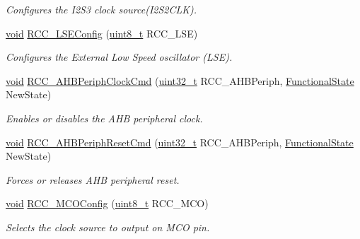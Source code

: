 \begin{DoxyCompactItemize}
\begin{DoxyCompactList}\small\item\em Configures the I2\-S3 clock source(\-I2\-S2\-C\-L\-K). \end{DoxyCompactList}\item 
\hyperlink{group___n_a_m_e_ga18028b8badbf1ea7e704ccac3c488e82}{void} \hyperlink{group___r_c_c___exported___functions_ga65209ab5c3589b249c7d70f978735ca6}{R\-C\-C\-\_\-\-L\-S\-E\-Config} (\hyperlink{stdint_8h_aba7bc1797add20fe3efdf37ced1182c5}{uint8\-\_\-t} R\-C\-C\-\_\-\-L\-S\-E)
\begin{DoxyCompactList}\small\item\em Configures the External Low Speed oscillator (L\-S\-E). \end{DoxyCompactList}\item 
\hyperlink{group___n_a_m_e_ga18028b8badbf1ea7e704ccac3c488e82}{void} \hyperlink{group___r_c_c___exported___functions_gae0b30d8598b8393bdba9c3fefba3a968}{R\-C\-C\-\_\-\-A\-H\-B\-Periph\-Clock\-Cmd} (\hyperlink{stdint_8h_a435d1572bf3f880d55459d9805097f62}{uint32\-\_\-t} R\-C\-C\-\_\-\-A\-H\-B\-Periph, \hyperlink{group___exported__types_gac9a7e9a35d2513ec15c3b537aaa4fba1}{Functional\-State} New\-State)
\begin{DoxyCompactList}\small\item\em Enables or disables the A\-H\-B peripheral clock. \end{DoxyCompactList}\item 
\hyperlink{group___n_a_m_e_ga18028b8badbf1ea7e704ccac3c488e82}{void} \hyperlink{group___r_c_c___exported___functions_ga0d6761fbffe7e916c7aa043cabde180a}{R\-C\-C\-\_\-\-A\-H\-B\-Periph\-Reset\-Cmd} (\hyperlink{stdint_8h_a435d1572bf3f880d55459d9805097f62}{uint32\-\_\-t} R\-C\-C\-\_\-\-A\-H\-B\-Periph, \hyperlink{group___exported__types_gac9a7e9a35d2513ec15c3b537aaa4fba1}{Functional\-State} New\-State)
\begin{DoxyCompactList}\small\item\em Forces or releases A\-H\-B peripheral reset. \end{DoxyCompactList}\item 
\hyperlink{group___n_a_m_e_ga18028b8badbf1ea7e704ccac3c488e82}{void} \hyperlink{group___r_c_c___exported___functions_ga8f62b86c6ca8ae6585ba1cec79431fe5}{R\-C\-C\-\_\-\-M\-C\-O\-Config} (\hyperlink{stdint_8h_aba7bc1797add20fe3efdf37ced1182c5}{uint8\-\_\-t} R\-C\-C\-\_\-\-M\-C\-O)
\begin{DoxyCompactList}\small\item\em Selects the clock source to output on M\-C\-O pin. \end{DoxyCompactList}\end{DoxyCompactItemize}


